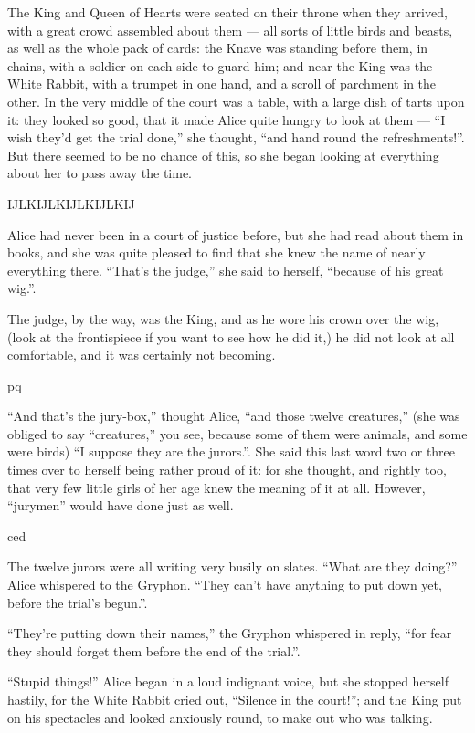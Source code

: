 \documentclass[a4paper]{article}
\newcommand{\wb}[2]{\fontsize{#1}{#2}\usefont{U}{webo}{xl}{n}}
\newcommand{\wbc}[3]{\vspace*{#1}\begin{center}
    \wb{#2}{#2}#3\end{center}\vspace*{#1}}
\begin{document}
  The King and Queen of Hearts were seated on their throne
  when they arrived, with a great crowd assembled about them
  --- all sorts of little birds and beasts, as well as the
  whole pack of cards: the Knave was standing before them,
  in chains, with a soldier on each side to guard him; and
  near the King was the White Rabbit, with a trumpet in one
  hand, and a scroll of parchment in the other.  In the very
  middle of the court was a table, with a large dish of
  tarts upon it: they looked so good, that it made Alice
  quite hungry to look at them --- ``I wish they'd get the
  trial done,'' she thought, ``and hand round the
  refreshments!''.  But there seemed to be no chance of this,
  so she began looking at everything about her to pass away
  the time.

  \wbc{2ex}{6}{IJLKIJLKIJLKIJLKIJ}
  
  Alice had never been in a court of justice before, but she
  had read about them in books, and she was quite pleased to
  find that she knew the name of nearly everything there.
  ``That's the judge,'' she said to herself, ``because of his
  great wig.''.
  
  The judge, by the way, was the King, and as he wore his
  crown over the wig, (look at the frontispiece if you want
  to see how he did it,) he did not look at all comfortable,
  and it was certainly not becoming.

  \wbc{1ex}{8}{pq}
  
  ``And that's the jury-box,'' thought Alice, ``and those
  twelve creatures,'' (she was obliged to say ``creatures,''
  you see, because some of them were animals, and some were
  birds) ``I suppose they are the jurors.''.  She said this
  last word two or three times over to herself being rather
  proud of it: for she thought, and rightly too, that very
  few little girls of her age knew the meaning of it at all.
  However, ``jurymen'' would have done just as well.

  \wbc{1ex}{10}{ced}
  
  The twelve jurors were all writing very busily on slates.
  ``What are they doing?'' Alice whispered to the Gryphon.
  ``They can't have anything to put down yet, before the
  trial's begun.''.
  
  ``They're putting down their names,'' the Gryphon
  whispered in reply, ``for fear they should forget them
  before the end of the trial.''.
  
  ``Stupid things!'' Alice began in a loud indignant voice,
  but she stopped herself hastily, for the White Rabbit
  cried out, ``Silence in the court!''; and the King put on
  his spectacles and looked anxiously round, to make out who
  was talking.
\end{document}
